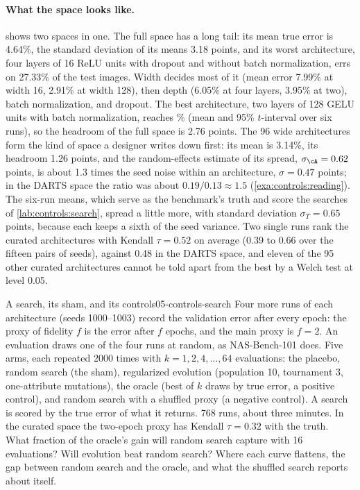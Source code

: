 \begin{refsection}
\paragraph{What the space looks like.}  shows two spaces in one. The full space has a long tail: its mean true error is 4.64\%, the standard deviation of its means 3.18 points, and its worst architecture, four layers of 16 ReLU units with dropout and without batch normalization, errs on 27.33\% of the test images. Width decides most of it (mean error 7.99\% at width 16, 2.91\% at width 128), then depth (6.05\% at four layers, 3.95\% at two), batch normalization, and dropout. The best architecture, two layers of 128 GELU units with batch normalization, reaches \% (mean and 95\% $t$-interval over six runs), so the headroom of the full space is 2.76 points. The 96 wide architectures form the kind of space a designer writes down first: its mean is 3.14\%, its headroom 1.26 points, and the random-effects estimate of its spread, $\sigma_{\cA}=0.62$ points, is about 1.3 times the seed noise within an architecture, $\sigma=0.47$ points; in the DARTS space the ratio was about $0.19/0.13\approx1.5$ (\cref{exa:controls:reading}). The six-run means, which serve as the benchmark's truth and score the searches of \cref{lab:controls:search}, spread a little more, with standard deviation $\sigma_T=0.65$ points, because each keeps a sixth of the seed variance. Two single runs rank the curated architectures with Kendall $\tau=0.52$ on average (0.39 to 0.66 over the fifteen pairs of seeds), against 0.48 in the DARTS space, and eleven of the 95 other curated architectures cannot be told apart from the best by a Welch test at level 0.05.

\begin{lab}{A search, its sham, and its controls}{05-controls-search}\label{lab:controls:search}
 Four more runs of each architecture (seeds 1000--1003) record the validation error after every epoch: the proxy of fidelity $f$ is the error after $f$ epochs, and the main proxy is $f=2$. An evaluation draws one of the four runs at random, as NAS-Bench-101 does. Five arms, each repeated 2000 times with $k=1,2,4,\dots,64$ evaluations: the placebo, random search (the sham), regularized evolution (population 10, tournament 3, one-attribute mutations), the oracle (best of $k$ draws by true error, a positive control), and random search with a shuffled proxy (a negative control). A search is scored by the true error of what it returns. 768 runs, about three minutes.
 In the curated space the two-epoch proxy has Kendall $\tau=0.32$ with the truth. What fraction of the oracle's gain will random search capture with 16 evaluations? Will evolution beat random search?
 Where each curve flattens, the gap between random search and the oracle, and what the shuffled search reports about itself.
\end{lab}


\end{refsection}
